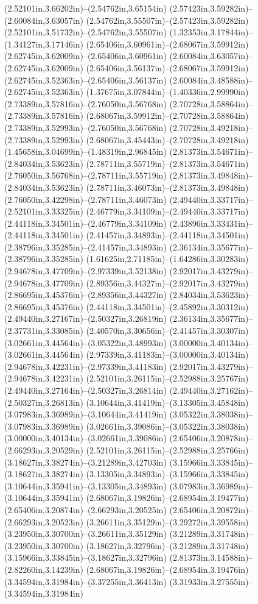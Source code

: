 (2.52101in,3.66202in)--(2.54762in,3.65154in) (2.57423in,3.59282in)--(2.60084in,3.63057in) (2.54762in,3.55507in)--(2.57423in,3.59282in) (2.52101in,3.51732in)--(2.54762in,3.55507in) (1.32353in,3.17844in)--(1.34127in,3.17146in) (2.65406in,3.60961in)--(2.68067in,3.59912in) (2.62745in,3.62009in)--(2.65406in,3.60961in) (2.60084in,3.63057in)--(2.62745in,3.62009in) (2.65406in,3.56137in)--(2.68067in,3.59912in) (2.62745in,3.52363in)--(2.65406in,3.56137in) (2.60084in,3.48588in)--(2.62745in,3.52363in) (1.37675in,3.07844in)--(1.40336in,2.99990in) (2.73389in,3.57816in)--(2.76050in,3.56768in) (2.70728in,3.58864in)--(2.73389in,3.57816in) (2.68067in,3.59912in)--(2.70728in,3.58864in) (2.73389in,3.52993in)--(2.76050in,3.56768in) (2.70728in,3.49218in)--(2.73389in,3.52993in) (2.68067in,3.45443in)--(2.70728in,3.49218in) (1.45658in,3.04699in)--(1.48319in,2.96845in) (2.81373in,3.54671in)--(2.84034in,3.53623in) (2.78711in,3.55719in)--(2.81373in,3.54671in) (2.76050in,3.56768in)--(2.78711in,3.55719in) (2.81373in,3.49848in)--(2.84034in,3.53623in) (2.78711in,3.46073in)--(2.81373in,3.49848in) (2.76050in,3.42298in)--(2.78711in,3.46073in) (2.49440in,3.33717in)--(2.52101in,3.33325in) (2.46779in,3.34109in)--(2.49440in,3.33717in) (2.44118in,3.34501in)--(2.46779in,3.34109in) (2.43896in,3.33431in)--(2.44118in,3.34501in) (2.41457in,3.34893in)--(2.44118in,3.34501in) (2.38796in,3.35285in)--(2.41457in,3.34893in) (2.36134in,3.35677in)--(2.38796in,3.35285in) (1.61625in,2.71185in)--(1.64286in,3.30283in) (2.94678in,3.47709in)--(2.97339in,3.52138in) (2.92017in,3.43279in)--(2.94678in,3.47709in) (2.89356in,3.44327in)--(2.92017in,3.43279in) (2.86695in,3.45376in)--(2.89356in,3.44327in) (2.84034in,3.53623in)--(2.86695in,3.45376in) (2.44118in,3.34501in)--(2.45892in,3.30312in) (2.49440in,3.27167in)--(2.50327in,3.26819in) (2.36134in,3.35677in)--(2.37731in,3.33085in) (2.40570in,3.30656in)--(2.41457in,3.30307in) (3.02661in,3.44564in)--(3.05322in,3.48993in) (3.00000in,3.40134in)--(3.02661in,3.44564in) (2.97339in,3.41183in)--(3.00000in,3.40134in) (2.94678in,3.42231in)--(2.97339in,3.41183in) (2.92017in,3.43279in)--(2.94678in,3.42231in) (2.52101in,3.26115in)--(2.52988in,3.25767in) (2.49440in,3.27164in)--(2.50327in,3.26814in) (2.49440in,3.27162in)--(2.50327in,3.26813in) (3.10644in,3.41419in)--(3.13305in,3.45848in) (3.07983in,3.36989in)--(3.10644in,3.41419in) (3.05322in,3.38038in)--(3.07983in,3.36989in) (3.02661in,3.39086in)--(3.05322in,3.38038in) (3.00000in,3.40134in)--(3.02661in,3.39086in) (2.65406in,3.20878in)--(2.66293in,3.20529in) (2.52101in,3.26115in)--(2.52988in,3.25766in) (3.18627in,3.38274in)--(3.21289in,3.42703in) (3.15966in,3.33845in)--(3.18627in,3.38274in) (3.13305in,3.34893in)--(3.15966in,3.33845in) (3.10644in,3.35941in)--(3.13305in,3.34893in) (3.07983in,3.36989in)--(3.10644in,3.35941in) (2.68067in,3.19826in)--(2.68954in,3.19477in) (2.65406in,3.20874in)--(2.66293in,3.20525in) (2.65406in,3.20872in)--(2.66293in,3.20523in) (3.26611in,3.35129in)--(3.29272in,3.39558in) (3.23950in,3.30700in)--(3.26611in,3.35129in) (3.21289in,3.31748in)--(3.23950in,3.30700in) (3.18627in,3.32796in)--(3.21289in,3.31748in) (3.15966in,3.33845in)--(3.18627in,3.32796in) (2.81373in,3.14588in)--(2.82260in,3.14239in) (2.68067in,3.19826in)--(2.68954in,3.19476in) (3.34594in,3.31984in)--(3.37255in,3.36413in) (3.31933in,3.27555in)--(3.34594in,3.31984in) 